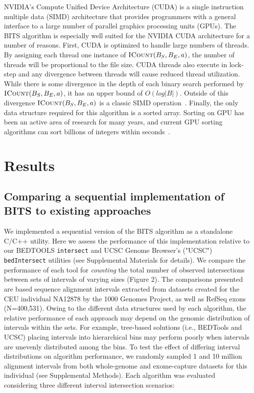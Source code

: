 \documentclass{bioinfo}
\begin{document}
NVIDIA's Compute Unified Device Architecture (CUDA) is a single instruction
multiple data (SIMD) architecture that provides programmers with 
a general interface to a large number of parallel graphics processing units 
(GPUs).  The BITS algorithm is especially well suited for the NVIDIA CUDA 
architecture for a number of reasons.  First, CUDA is optimized to handle large 
numbers of threads. By assigning each thread one instance of 
$\textsc{ICount}(B_S,B_E,a)$, the number of threads will be proportional to the 
file size.  CUDA threads also execute in lock-step and any divergence between 
threads will cause reduced thread utilization.  While there is some divergence 
in the depth of each binary search performed by $\textsc{ICount}(B_S,B_E,a)$, it 
has an upper bound of $O(log |B|)$.  Outside of this divergence 
$\textsc{ICount}(B_S,B_E,a)$ is a classic SIMD operation~\citep{kirk2010}.  
Finally, the only data structure required for this algorithm is a sorted array.  
Sorting on GPU has been an active area of research for many years, and current 
GPU sorting algorithms can sort billions of integers within 
seconds~\citep{merrill2011}.

\section{Results}

\subsection{Comparing a sequential implementation of BITS to existing 
approaches}
We implemented a sequential version of the BITS algorithm as a standalone C/C++
utility. Here we assess the performance of this implementation 
relative to our BEDTOOLS \texttt{intersect} and UCSC Genome Browser's ("UCSC") 
\citep{kent2002} \texttt{bedIntersect} utilities (see Supplemental Materials for
details).  We compare the performance of each tool for \emph{counting} the total 
number of observed intersections between sets of intervals of varying sizes 
(Figure 2). The comparisons presented are based sequence alignment intervals 
extracted from datasets created for the CEU individual NA12878 by the 1000 
Genomes Project\citep{durbin2010}, as well as RefSeq exons (N=400,531). Owing to
the different data structures used by each algorithm, the relative performance 
of each approach may depend on the genomic distribution of intervals within the
sets. For example, tree-based solutions (i.e., BEDTools and UCSC) placing
intervals into hierarchical bins may perform poorly when intervals are unevenly
distributed among the bins. To test the effect of differing interval
distributions on algorithm performance, we randomly sampled 1 and 10 million
alignment intervals from both whole-genome and exome-capture datasets for this
individual (see Supplemental Methods). Each algorithm was evaluated considering
three different interval intersection scenarios:
\end{document}
